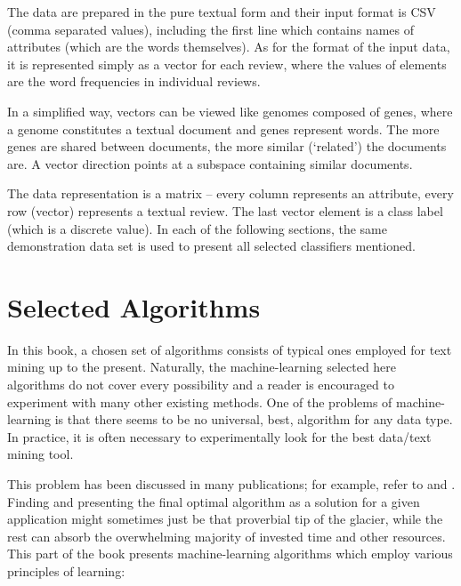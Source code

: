 The data are prepared in the pure textual form and their input format is CSV
(comma separated values), including the first line which contains names of attributes (which are the words themselves). As for the format of the input data, it
is represented simply as a vector for each review, where the values of elements
are the word frequencies in individual reviews.

In a simplified way, vectors can be viewed like genomes composed of genes,
where a genome constitutes a textual document and genes represent words. The
more genes are shared between documents, the more similar (‘related’) the documents are. A vector direction points at a subspace containing similar documents.

The data representation is a matrix – every column represents an attribute,
every row (vector) represents a textual review. The last vector element is a class
label (which is a discrete value). In each of the following sections, the same
demonstration data set is used to present all selected classifiers mentioned.

\section{Selected Algorithms}

In this book, a chosen set of algorithms consists of typical ones employed for
text mining up to the present. Naturally, the machine-learning selected here algorithms do not cover every possibility and a reader is encouraged to experiment
with many other existing methods. One of the problems of machine-learning is
that there seems to be no universal, best, algorithm for any data type. In practice,
it is often necessary to experimentally look for the best data/text mining tool.

This problem has been discussed in many publications; for example, refer to
\cite{ref281} and \cite{ref282}. Finding and presenting the final optimal algorithm as a solution
for a given application might sometimes just be that proverbial tip of the glacier,
while the rest can absorb the overwhelming majority of invested time and other
resources.
This part of the book presents machine-learning algorithms which employ
various principles of learning:

